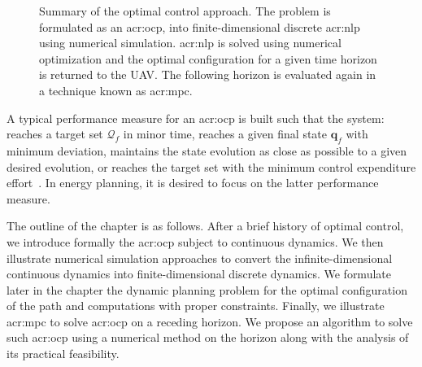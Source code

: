 \begin{figure}[!h]
    \centering
    \footnotesize
    \caption[Summary of the optimal control approach]{Summary of the optimal control approach. The problem is formulated as an \Gls{acr:ocp}, into finite-dimensional discrete \Gls{acr:nlp} using numerical simulation. \Gls{acr:nlp} is solved using numerical optimization and the optimal configuration for a given time horizon is returned to the UAV. The following horizon is evaluated again in a technique known as \Gls{acr:mpc}.}
    \label{fig:opt:process-summary}
\end{figure}

A typical performance measure for an \Gls{acr:ocp} is built such that the system: reaches a target set $\mathcal{Q}_f$ in minor time, reaches a given final state $\mathbf{q}_f$ with minimum deviation, maintains the state evolution as close as possible to a given desired evolution, or reaches the target set with the minimum control expenditure effort~\citep{kirk2004optimal}. In energy planning, it is desired to focus on the latter performance measure. 

The outline of the chapter is as follows. After a brief history of optimal control, we introduce formally the \Gls{acr:ocp} subject to continuous dynamics. We then illustrate numerical simulation approaches to convert the infinite-dimensional continuous dynamics into finite-dimensional discrete dynamics. We formulate later in the chapter the dynamic planning problem for the optimal configuration of the path and computations with proper constraints. Finally, we illustrate \Gls{acr:mpc} to solve \Gls{acr:ocp} on a receding horizon. We propose an algorithm to solve such \Gls{acr:ocp} using a numerical method on the horizon along with the analysis of its practical feasibility.


